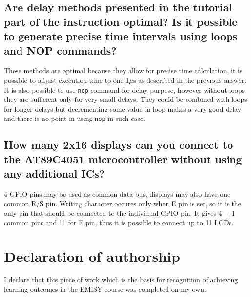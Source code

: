 \documentclass{article}
\begin{document}
\subsection*{Are delay methods presented in the tutorial part of the instruction optimal? Is it possible to generate precise
time intervals using loops and NOP commands?}
These methods are optimal because they allow for precise time calculation, it is possible
to adjust execution time to one 1$\mu$s as described in the previous answer. It is
also possible to use \texttt{nop} command for delay purpose, however without loops they
are sufficient only for very small delays. They could be combined with loops for longer delays
but decrementing some value in loop makes a very good delay and there is no point in using 
\texttt{nop} in such case.

\subsection*{How many 2x16 displays can you connect to the AT89C4051 microcontroller without using any additional
ICs?}
4 GPIO pins may be used as common data bus, displays may also have one common R/S pin.
Writing character occures only when E pin is set, so it is the only pin that should be
connected to the individual GPIO pin. It gives 4 + 1 common pins and 11 for E pin, thus
it is possible to connect up to 11 LCDs.

\section*{Declaration of authorship}
I declare that this piece of work which is the basis for recognition of achieving learning outcomes in the EMISY course was completed on my own.
\end{document}
